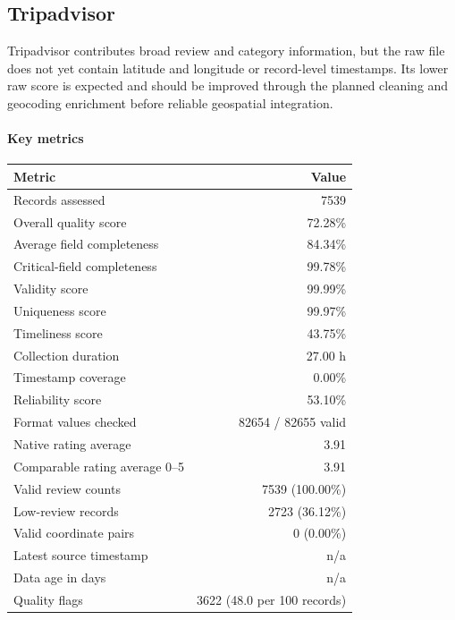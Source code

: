 \subsection{Tripadvisor}

Tripadvisor contributes broad review and category information, but the raw file does not yet contain latitude and longitude or record-level timestamps. Its lower raw score is expected and should be improved through the planned cleaning and geocoding enrichment before reliable geospatial integration.

\paragraph{Key metrics}
\begin{tabular}{lr}
\toprule
Metric & Value \\
\midrule
Records assessed & 7539 \\
Overall quality score & 72.28\% \\
Average field completeness & 84.34\% \\
Critical-field completeness & 99.78\% \\
Validity score & 99.99\% \\
Uniqueness score & 99.97\% \\
Timeliness score & 43.75\% \\
Collection duration & 27.00 h \\
Timestamp coverage & 0.00\% \\
Reliability score & 53.10\% \\
Format values checked & 82654 / 82655 valid \\
Native rating average & 3.91 \\
Comparable rating average 0--5 & 3.91 \\
Valid review counts & 7539 (100.00\%) \\
Low-review records & 2723 (36.12\%) \\
Valid coordinate pairs & 0 (0.00\%) \\
Latest source timestamp & n/a \\
Data age in days & n/a \\
Quality flags & 3622 (48.0 per 100 records) \\
\bottomrule
\end{tabular}

